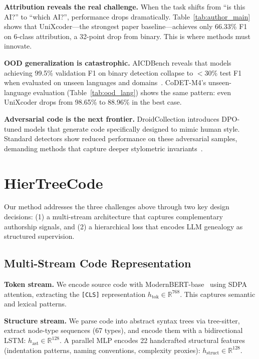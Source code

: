 \documentclass{article}
\begin{document}
\textbf{Attribution reveals the real challenge.} When the task shifts from ``is this AI?'' to ``which AI?'', performance drops dramatically. Table~\ref{tab:author_main} shows that UniXcoder---the strongest paper baseline---achieves only 66.33\% F1 on 6-class attribution, a 32-point drop from binary. This is where methods must innovate.

\textbf{OOD generalization is catastrophic.} AICDBench reveals that models achieving 99.5\% validation F1 on binary detection collapse to $<$30\% test F1 when evaluated on unseen languages and domains~\citep{aicd2025}. CoDET-M4's unseen-language evaluation (Table~\ref{tab:ood_lang}) shows the same pattern: even UniXcoder drops from 98.65\% to 88.96\% in the best case.

\textbf{Adversarial code is the next frontier.} DroidCollection introduces DPO-tuned models that generate code specifically designed to mimic human style. Standard detectors show reduced performance on these adversarial samples, demanding methods that capture deeper stylometric invariants~\citep{droid2025}.


\section{HierTreeCode}
\label{sec:method}

Our method addresses the three challenges above through two key design decisions: (1) a multi-stream architecture that captures complementary authorship signals, and (2) a hierarchical loss that encodes LLM genealogy as structured supervision.

\subsection{Multi-Stream Code Representation}

\textbf{Token stream.} We encode source code with ModernBERT-base~\citep{modernbert2024} using SDPA attention, extracting the \texttt{[CLS]} representation $h_{\text{tok}} \in \mathbb{R}^{768}$. This captures semantic and lexical patterns.

\textbf{Structure stream.} We parse code into abstract syntax trees via tree-sitter, extract node-type sequences (67 types), and encode them with a bidirectional LSTM: $h_{\text{ast}} \in \mathbb{R}^{128}$. A parallel MLP encodes 22 handcrafted structural features (indentation patterns, naming conventions, complexity proxies): $h_{\text{struct}} \in \mathbb{R}^{128}$.
\end{document}
